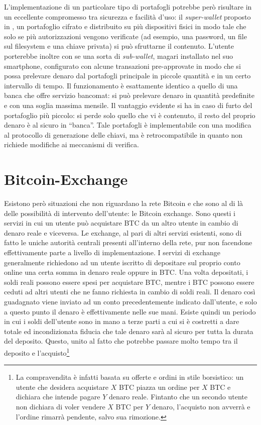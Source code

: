 L'implementazione di un particolare tipo di portafogli potrebbe però risultare in un eccellente compromesso tra sicurezza e facilità d'uso: il \emph{super-wallet} proposto in \cite{bitter-better}, un portafoglio cifrato e distribuito su più dispositivi fisici in modo tale che solo se più autorizzazioni vengono verificate (ad esempio, una password, un file sul filesystem e una chiave privata) si può sfruttarne il contenuto. L'utente porterebbe inoltre con se una sorta di \emph{sub-wallet}, magari installato nel suo smartphone, configurato con alcune transazioni pre-approvate in modo che si possa prelevare denaro dal portafogli principale in piccole quantità e in un certo intervallo di tempo. Il funzionamento è esattamente identico a quello di una banca che offre servizio bancomat: si può prelevare denaro in quantità predefinite e con una soglia massima mensile. Il vantaggio evidente si ha in caso di furto del portafoglio più piccolo: si perde solo quello che vi è contenuto, il resto del proprio denaro è al sicuro in ``banca''.
Tale portafogli è implementabile con una modifica al protocollo di generazione delle chiavi, ma è retrocompatibile in quanto non richiede modifiche ai meccanismi di verifica.

\section{Bitcoin-Exchange}\label{bitcoin-exchange}

Esistono però situazioni che non riguardano la rete Bitcoin e che sono al di là delle possibilità di intervento dell'utente: le Bitcoin exchange.
Sono questi i servizi in cui un utente può acquistare BTC da un altro utente in cambio di denaro reale e viceversa. Le exchange, al pari di altri servizi esistenti, sono di fatto le uniche autorità centrali presenti all'interno della rete, pur non facendone effettivamente parte a livello di implementazione.
I servizi di exchange generalmente richiedono ad un utente iscritto di depositare sul proprio conto online una certa somma in denaro reale oppure in BTC. Una volta depositati, i soldi reali possono essere spesi per acquistare BTC, mentre i BTC possono essere ceduti ad altri utenti che ne fanno richiesta in cambio di soldi reali. Il denaro così guadagnato viene inviato ad un conto precedentemente indicato dall'utente, e solo a questo punto il denaro è effettivamente nelle sue mani.
Esiste quindi un periodo in cui i soldi dell'utente sono in mano a terze parti a cui si è costretti a dare totale ed incondizionata fiducia che tale denaro sarà al sicuro per tutta la durata del deposito. Questo, unito al fatto che potrebbe passare molto tempo tra il deposito e l'acquisto\footnote{La compravendita è infatti basata su offerte e ordini in stile borsistico: un utente che desidera acquistare $X$ BTC piazza un ordine per $X$ BTC e dichiara che intende pagare $Y$ denaro reale. Fintanto che un secondo utente non dichiara di voler vendere $X$ BTC per $Y$ denaro, l'acquisto non avverrà e l'ordine rimarrà pendente, salvo sua rimozione.}

